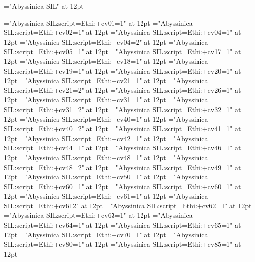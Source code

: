 
\nopagenumbers
\parindent=0pt

\def\cv{\vskip 12pt\A \parindent=0pt}
\def\IndSS{\par\A \parindent=12pt}


\font\A="Abyssinica SIL" at 12pt

\font\OTone="Abyssinica SIL:script=Ethi:+cv01=1" at 12pt
\font\OTtwo="Abyssinica SIL:script=Ethi:+cv02=1" at 12pt
\font\OTfourone="Abyssinica SIL:script=Ethi:+cv04=1" at 12pt
\font\OTfourtwo="Abyssinica SIL:script=Ethi:+cv04=2" at 12pt 
\font\OTfive="Abyssinica SIL:script=Ethi:+cv05=1" at 12pt
\font\OTseventeen="Abyssinica SIL:script=Ethi:+cv17=1" at 12pt 
\font\OTeighteen="Abyssinica SIL:script=Ethi:+cv18=1" at 12pt 
\font\OTnineteen="Abyssinica SIL:script=Ethi:+cv19=1" at 12pt
\font\OTtwenty="Abyssinica SIL:script=Ethi:+cv20=1" at 12pt 
\font\OTtwentyoneone="Abyssinica SIL:script=Ethi:+cv21=1" at 12pt
\font\OTtwentyonetwo="Abyssinica SIL:script=Ethi:+cv21=2" at 12pt 
\font\OTtwentysix="Abyssinica SIL:script=Ethi:+cv26=1" at 12pt
\font\OTthirtyoneone="Abyssinica SIL:script=Ethi:+cv31=1" at 12pt
\font\OTthirtyonetwo="Abyssinica SIL:script=Ethi:+cv31=2" at 12pt 
\font\OTthirtytwo="Abyssinica SIL:script=Ethi:+cv32=1" at 12pt
\font\OTfortyone="Abyssinica SIL:script=Ethi:+cv40=1" at 12pt
\font\OTfortytwo="Abyssinica SIL:script=Ethi:+cv40=2" at 12pt 
\font\OTfortyoneone="Abyssinica SIL:script=Ethi:+cv41=1" at 12pt
\font\OTfortytwoone="Abyssinica SIL:script=Ethi:+cv42=1" at 12pt
\font\OTfortyfive="Abyssinica SIL:script=Ethi:+cv44=1" at 12pt
\font\OTfortysix="Abyssinica SIL:script=Ethi:+cv46=1" at 12pt
\font\OTfortyeightone="Abyssinica SIL:script=Ethi:+cv48=1" at 12pt
\font\OTfortyeighttwo="Abyssinica SIL:script=Ethi:+cv48=2" at 12pt 
\font\OTfortynine="Abyssinica SIL:script=Ethi:+cv49=1" at 12pt
\font\OTfifty="Abyssinica SIL:script=Ethi:+cv50=1" at 12pt
\font\OTsixtyone="Abyssinica SIL:script=Ethi:+cv60=1" at 12pt
\font\OTsixtytwo="Abyssinica SIL:script=Ethi:+cv60=1" at 12pt 
\font\OTsixtyoneone="Abyssinica SIL:script=Ethi:+cv61=1" at 12pt
\font\OTsixtyonetwo="Abyssinica SIL:script=Ethi:+cv61{2}" at 12pt 
\font\OTsixtytwoone="Abyssinica SIL:script=Ethi:+cv62=1" at 12pt
\font\OTsixtythree="Abyssinica SIL:script=Ethi:+cv63=1" at 12pt
\font\OTsixtyfour="Abyssinica SIL:script=Ethi:+cv64=1" at 12pt
\font\OTsixtyfive="Abyssinica SIL:script=Ethi:+cv65=1" at 12pt 
\font\OTseventy="Abyssinica SIL:script=Ethi:+cv70=1" at 12pt
\font\OTeighty="Abyssinica SIL:script=Ethi:+cv80=1" at 12pt
\font\OTeightyfive="Abyssinica SIL:script=Ethi:+cv85=1" at 12pt


